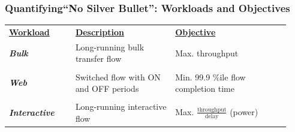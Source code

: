 \begin{Large}
\begin{frame}[plain]
\frametitle{Quantifying``No Silver Bullet'': Workloads and Objectives}

\begin{table}
\begin{tabular}{|p{0.22\linewidth}|p{0.33\linewidth}|p{0.38\linewidth}|}
\hline
{\bf \underline{Workload}} & {\bf \underline{Description}} & {\bf \underline{Objective}} \\
\textbf{\emph{Bulk}} & Long-running bulk transfer flow & Max. throughput \\
& &\\
\textbf{\emph{Web}} & Switched flow with ON and OFF periods &
Min. 99.9 \%ile flow completion time \\
& &\\
\textbf{\emph{Interactive}} & Long-running interactive flow & Max. $\frac{\mbox{throughput}}{\mbox{delay}}$ (power) \\ 
\hline
\end{tabular}
\end{table}
\end{frame}


\end{Large}
